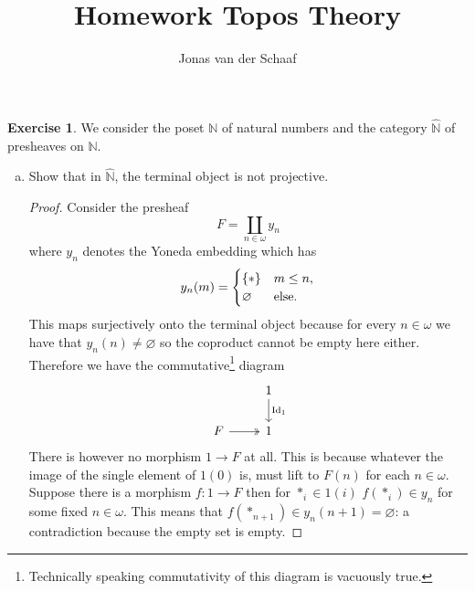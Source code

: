 \documentclass{article}
\title{Homework Topos Theory}
\author{Jonas van der Schaaf}
\date{}
\newcommand{\N}{\mathbb{N}}
\DeclareMathOperator{\Id}{Id}
\newcommand{\set}[1]{\left\{#1\right\}}
\newcommand{\psh}[1]{\widehat{#1}}
\theoremstyle{definition}
\newtheorem{question}{Exercise}
\begin{document}
\maketitle

\begin{question}
    We consider the poset \(\N\) of natural numbers and the category
    \(\psh{\N}\) of presheaves on \(\N\).

    \begin{enumerate}[a)]
        \item Show that in \(\psh{\N}\), the terminal object is not projective.

              \begin{proof}
                  Consider the presheaf
                  \[
                      F=\coprod_{n\in\omega}y_{n}
                  \]
                  where \(y_{n}\) denotes the Yoneda embedding which has
                  \[
                      y_{n}(m)=\begin{cases}
                          \set{*}     & m\leq n,           \\
                          \varnothing & \textnormal{else}.
                      \end{cases}
                  \]
                  This maps surjectively onto the terminal object because for
                  every \(n\in\omega\) we have that \(y_{n}(n)\neq\varnothing\)
                  so the coproduct cannot be empty here either. Therefore we
                  have the commutative\footnote{Technically speaking
                      commutativity of this diagram is vacuously true.} diagram
                  \[
                      \begin{tikzcd}[ampersand replacement=\&]
                          \& 1 \\
                          {F} \& 1
                          \arrow["\Id_{1}", from=1-2, to=2-2]
                          \arrow[two heads, from=2-1, to=2-2]
                      \end{tikzcd}
                  \]
                  There is however no morphism \(1\to F\) at all. This is
                  because whatever the image of the single element of \(1(0)\)
                  is, must lift to \(F(n)\) for each \(n\in\omega\). Suppose
                  there is a morphism \(f:1\to F\) then for \(*_{i}\in1(i)\)
                  \(f(*_{i})\in y_{n}\) for some fixed \(n\in\omega\). This
                  means that \(f(*_{n+1})\in y_{n}(n+1)=\varnothing\): a contradiction
                  because the empty set is empty.



\end{proof}
\end{enumerate}
\end{question}
\end{document}
